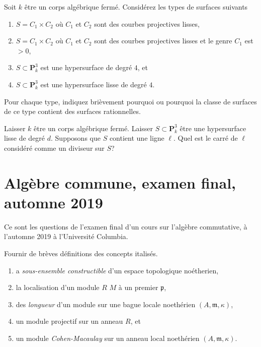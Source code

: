 \begin{exercise}
\label{exercise-rational-surface}
Soit $k$ être un corps algébrique fermé. Considérez les types
de surfaces suivants
\begin{enumerate}
\item $S = C_1 \times C_2$ où $C_1$ et $C_2$ sont des courbes projectives lisses,
\item $S = C_1 \times C_2$ où $C_1$ et $C_2$ sont des courbes projectives lisses et
le genre $C_1$ est $> 0$,
\item $S \subset \mathbf{P}^3_k$ est une hypersurface de degré $4$, et
\item $S \subset \mathbf{P}^3_k$ est une hypersurface lisse de degré $4$.
\end{enumerate}
Pour chaque type, indiquez brièvement pourquoi ou pourquoi la classe de surfaces
de ce type contient des surfaces rationnelles.
\end{exercise}

\begin{exercise}
\label{exercise-self-square-line}
Laisser $k$ être un corps algébrique fermé. Laisser $S \subset \mathbf{P}^3_k$ être une
hypersurface lisse de degré $d$. Supposons que $S$ contient une ligne
$\ell$. Quel est le carré de $\ell$ considéré comme un diviseur sur $S$?
\end{exercise}






\section{Algèbre commune, examen final, automne 2019}
\label{section-final-exam-fall-2019}

\noindent
Ce sont les questions de l'examen final d'un cours sur l'algèbre commutative,
à l'automne 2019 à l'Université Columbia.

\begin{exercise}[Definitions]
\label{exercise-definitions-fall-2019}
Fournir de brèves définitions des concepts italisés.
\begin{enumerate}
\item a {\it sous-ensemble constructible} d'un espace topologique noétherien,
\item la localisation {\it} d'un module $R$ $M$ à un premier $\mathfrak p$,
\item des {\it longueur} d'un module sur une bague locale
noethérien $(A, \mathfrak m, \kappa)$,
\item un module projectif {\it} sur un anneau $R$, et
\item un module {\it Cohen-Macaulay} sur
un anneau local noethérien $(A, \mathfrak m, \kappa)$.
\end{enumerate}
\end{exercise}


